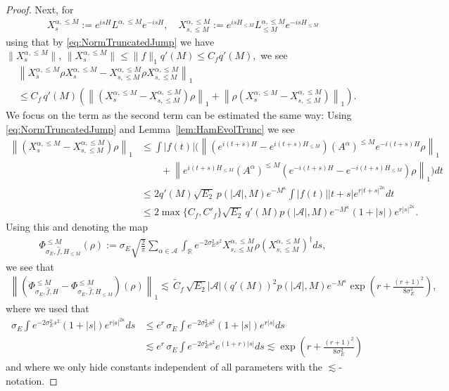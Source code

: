 \documentclass[11pt]{amsart}
\newcommand{\1}{\mathbbm{1}}
\newcommand{\cA}{\mathcal{A}}
\theoremstyle{plain}
\theoremstyle{definition}
\theoremstyle{remark}
\numberwithin{equation}{section}
\begin{document}
\begin{proof}
Next, for 
\begin{align*}
 X^{\alpha,\le M}_s:=e^{isH}L^{\alpha,\le M} e^{-isH}
,\quad  X^{\alpha,\le M}_{s,\le M}:=e^{isH_{\le M}}L^{\alpha,\le M}_{\le M} e^{-is{H_{\le M}}}
\end{align*}
using that by \eqref{eq:NormTruncatedJump} we have $\|X^{\alpha,\le M}_s\|,\, \|X^{\alpha,\le M}_s\|\le \|f\|_1 q'(M)\le C_f q'(M),$
we see 
\begin{align*}
    &\left\| X^{\alpha,\le M}_s\rho X^{\alpha,\le M}_s- X^{\alpha,\le M}_{s,\le M}\rho X^{\alpha,\le M}_{s,\le M}\right\|_1 \\&\le C_f\,q'(M)\left( \left\|\left(X^{\alpha,\le M}_s-  X^{\alpha,\le M}_{s,\le M}\right)\rho\right\|_1+\left\|\rho\left(X^{\alpha,\le M}_s-  X^{\alpha,\le M}_{s,\le M}\right)\right\|_1\right).
\end{align*}
We focus on the term as the second term can be estimated the same way:
Using \eqref{eq:NormTruncatedJump}
and Lemma~\ref{lem:HamEvolTrunc} we see
\begin{align*}
    \left\|\left(X^{\alpha,\le M}_s-  X^{\alpha,\le M}_{s,\le M}\right)\rho\right\|_1 &\le \int |f(t)|\Big(\left\|\left(e^{i(t+s)H}-e^{i(t+s)H_{\le M}}\right)(A^{\alpha})^{\le M} e^{-i(t+s)H}\rho\right\|_1 \\&\qquad+\left\|e^{i(t+s)H_{\le M}}(A^{\alpha})^{\le M} \left(e^{-i(t+s)H}-e^{-i(t+s)H_{\le M}}\right)\rho\right\|_1 \Big)dt\\&\le 2 q'(M)\sqrt{E_2}\,p(|\cA|,M)e^{-M^{\kappa}}\int |f(t)| |t+s| e^{r|t+s|^{2\kappa}}dt \\&\le2\max\{C_f,C'_f\} \sqrt{E_2}\, q'(M) p(|\cA|,M)e^{-M^\kappa} (1+|s|)e^{r|s|^{2\kappa}}.
\end{align*}
Using this and denoting the map
\begin{align}\label{phialphasigmaEmapTruncDouble}
\Phi^{\le M}_{\sigma_E,\widehat f,H_{\le M}}(\rho):=\sigma_E\sqrt{\frac{2}{\pi}}\sum_{\alpha\in\cA}\int_{\mathbb{R}}e^{-2\sigma_E^2 s^2}X^{\alpha,\le M}_{s,\le M} \rho (X^{\alpha,\le M}_{s,\le M})^\dagger ds,
\end{align}
we see that
\begin{align*}
\left\|\left(\Phi^{\le M}_{\sigma_E,\widehat f,H}-\Phi^{\le M}_{\sigma_E,\widehat f,H_{\le M}}\right)(\rho)\right\|_1\lesssim  \,\widetilde C_f\,\sqrt{E_2} |\cA|(q'(M))^2p(|\cA|,M)e^{-M^{\kappa}} \exp\left(r+\tfrac{(r+1)^2}{8\sigma^2_E}\right)  , 
\end{align*}
where we used that  
\begin{align*}
\,\sigma_E\int e^{-2\sigma^2_Es^2}(1+|s|) e^{r|s|^{2\kappa}}ds&\le  e^{r} \,\sigma_E\int e^{-2\sigma^2_Es^2}(1+|s|) e^{r|s|}ds\\&\lesssim e^{r} \,\sigma_E\int e^{-2\sigma^2_Es^2} e^{(1+r)|s|}ds \lesssim \exp\left(r+\tfrac{(r+1)^2}{8\sigma^2_E}\right)   
\end{align*}
and where we only hide constants independent of all parameters with the $\lesssim$-notation.


\end{proof}
\end{document}
